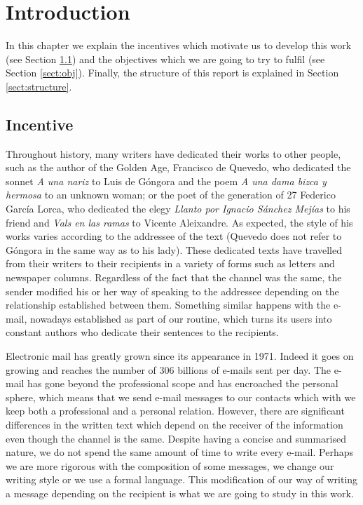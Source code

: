\chapter{Introduction}
\label{cap:introduccion}


In this chapter we explain the incentives which motivate us to develop this work (see Section \ref{sect:motiv}) and the objectives which we are going to try to fulfil (see Section \ref{sect:obj}). Finally, the structure of this report is explained in Section \ref{sect:structure}.

\section{Incentive}\label{sect:motiv}
Throughout history, many writers have dedicated their works to other people, such as the author of the Golden Age, Francisco de Quevedo, who dedicated the sonnet \textit{A una nariz} to Luis de Góngora and the poem \textit{A una dama bizca y hermosa} to an unknown woman; or the poet of the generation of 27 Federico García Lorca, who dedicated the elegy \textit{Llanto por Ignacio Sánchez Mejías} to his friend and \textit{Vals en las ramas} to Vicente Aleixandre. As expected, the style of his works varies according to the addressee of the text (Quevedo does not refer to Góngora in the same way as to his lady). These dedicated texts have travelled from their writers to their recipients in a variety of forms such as letters and newspaper columns. Regardless of the fact that the channel was the same, the sender modified his or her way of speaking to the addressee depending on the relationship established between them. Something similar happens with the e-mail, nowadays established as part of our routine, which turns its users into constant authors who dedicate their sentences to the recipients.

Electronic mail has greatly grown since its appearance in 1971. Indeed it goes on growing and reaches the number of 306 billions of e-mails sent per day. The e-mail has gone beyond the professional scope and has encroached the personal sphere, which means that we send e-mail messages to our contacts which with we keep both a professional and a personal relation. However, there are significant differences in the written text which depend on the receiver of the information even though the channel is the same. Despite having a concise and summarised nature, we do not spend the same amount of time to write every e-mail. Perhaps we are more rigorous with the composition of some messages, we change our writing style or we use a formal language. This modification of our way of writing a message depending on the recipient is what we are going to study in this work.

